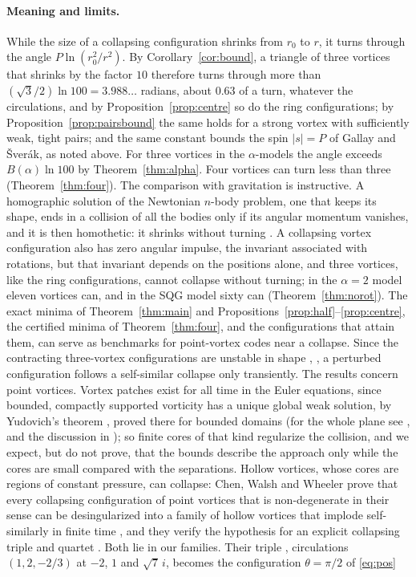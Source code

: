 \documentclass[11pt]{article}
\theoremstyle{definition}
\begin{document}
\paragraph{Meaning and limits.} While the size of a collapsing configuration shrinks from $r_0$ to $r$, it turns through the angle $P\ln(r_0^2/r^2)$. By Corollary~\ref{cor:bound}, a triangle of three vortices that shrinks by the factor $10$ therefore turns through more than $(\sqrt{3}/2)\ln 100 = 3.988\ldots$ radians, about $0.63$ of a turn, whatever the circulations, and by Proposition~\ref{prop:centre} so do the ring configurations; by Proposition~\ref{prop:pairsbound} the same holds for a strong vortex with sufficiently weak, tight pairs; and the same constant bounds the spin $|s| = P$ of Gallay and \v{S}ver\'ak, as noted above. For three vortices in the $\alpha$-models the angle exceeds $B(\alpha)\ln 100$ by Theorem~\ref{thm:alpha}. Four vortices can turn less than three (Theorem~\ref{thm:four}). The comparison with gravitation is instructive. A homographic solution of the Newtonian $n$-body problem, one that keeps its shape, ends in a collision of all the bodies only if its angular momentum vanishes, and it is then homothetic: it shrinks without turning \cite[\S\S~370\,bis, 378]{wintner1941}. A collapsing vortex configuration also has zero angular impulse, the invariant associated with rotations, but that invariant depends on the positions alone, and three vortices, like the ring configurations, cannot collapse without turning; in the $\alpha = 2$ model eleven vortices can, and in the SQG model sixty can (Theorem~\ref{thm:norot}). The exact minima of Theorem~\ref{thm:main} and Propositions~\ref{prop:half}--\ref{prop:centre}, the certified minima of Theorem~\ref{thm:four}, and the configurations that attain them, can serve as benchmarks for point-vortex codes near a collapse. Since the contracting three-vortex configurations are unstable in shape \cite[Sect.~II]{tt1988}, \cite{iy2023}, a perturbed configuration follows a self-similar collapse only transiently. The results concern point vortices. Vortex patches exist for all time in the Euler equations, since bounded, compactly supported vorticity has a unique global weak solution, by Yudovich's theorem \cite{yudovich1963}, proved there for bounded domains (for the whole plane see \cite[Theorems~1.6 and~3.3]{cs2024}, and the discussion in \cite[Sect.~1]{cww2026}); so finite cores of that kind regularize the collision, and we expect, but do not prove, that the bounds describe the approach only while the cores are small compared with the separations. Hollow vortices, whose cores are regions of constant pressure, can collapse: Chen, Walsh and Wheeler prove that every collapsing configuration of point vortices that is non-degenerate in their sense \cite[Definition~4.1]{cww2026} can be desingularized into a family of hollow vortices that implode self-similarly in finite time \cite[Theorems~1.3 and~4.4]{cww2026}, and they verify the hypothesis for an explicit collapsing triple and quartet \cite[Examples~4.2 and~4.3, Corollary~4.6]{cww2026}. Both lie in our families. Their triple \cite[Eq.~(4.5)]{cww2026}, circulations $(1, 2, -2/3)$ at $-2$, $1$ and $\sqrt{7}\,i$, becomes the configuration $\theta = \pi/2$ of \eqref{eq:pos} 
\end{document}
